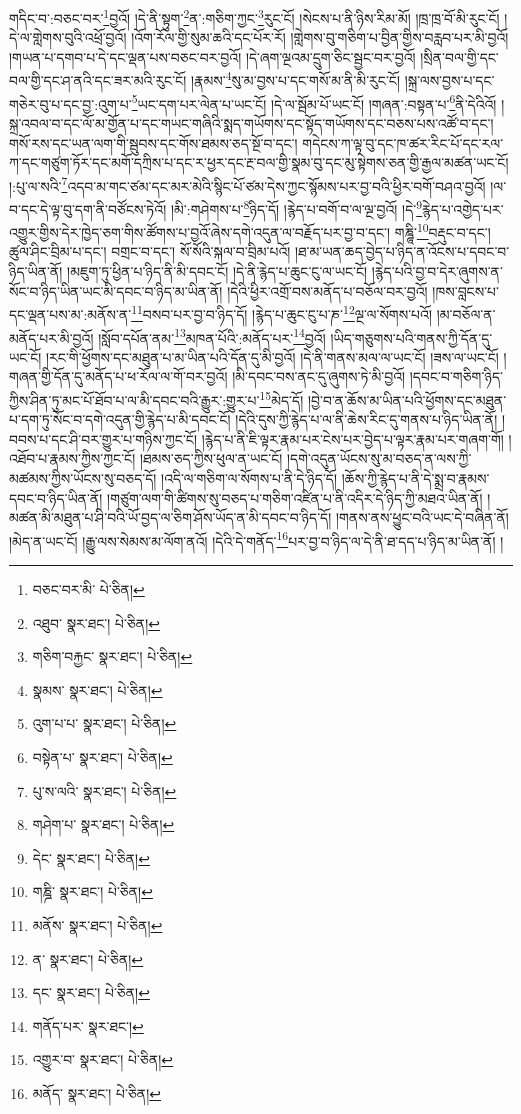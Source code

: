 གདིང་བ་:བཅང་བར་\footnote{བཅང་བར་མི་  པེ་ཅིན། }བྱའོ། །དེ་ནི་སྟུག་\footnote{འཐུབ་  སྣར་ཐང་།  པེ་ཅིན། }ན་:གཅིག་ཀྱང་\footnote{གཅིག་བརྐྱང་  སྣར་ཐང་།  པེ་ཅིན། }རུང་ངོ། །སེངས་པ་ནི་ཉིས་རིམ་མོ། །ཁྲ་ཁྲ་བོ་མི་རུང་ངོ། །དེ་ལ་གླེགས་བུའི་འཕྲོ་བྱའོ། །འོག་རོལ་གྱི་སུམ་ཆའི་དང་པོར་རོ། །གླེགས་བུ་གཅིག་པ་བྱིན་གྱིས་བརླབ་པར་མི་བྱའོ། །གཡན་པ་དགབ་པ་དེ་དང་ལྡན་པས་བཅང་བར་བྱའོ། །དེ་ཞག་ལྔའམ་དྲུག་ཅིང་སྦྱང་བར་བྱའོ། །སྲིན་བལ་གྱི་དང་བལ་གྱི་དང་ཤ་ནའི་དང་ཟར་མའི་རུང་ངོ། །རྣམས་\footnote{སྣམས་  སྣར་ཐང་།  པེ་ཅིན། }སུ་མ་བྱས་པ་དང་གསོ་མ་ནི་མི་རུང་ངོ། །སྐྲ་ལས་བྱས་པ་དང་གཅེར་བུ་པ་དང་བྱ་:འུག་པ་\footnote{འུག་པ་པ་  སྣར་ཐང་།  པེ་ཅིན། }ཡང་དག་པར་ལེན་པ་ཡང་ངོ། །དེ་ལ་སྦོམ་པོ་ཡང་ངོ། །གཞན་:བསྟན་པ་\footnote{བསྟེན་པ་  སྣར་ཐང་།  པེ་ཅིན། }ནི་དེའིའོ། །སྐྲ་འབལ་བ་དང་ལོ་མ་གྱོན་པ་དང་གཡང་གཞིའི་སྨད་གཡོགས་དང་སྟོད་གཡོགས་དང་བཅས་པས་འཚོ་བ་དང་། གསོ་རས་དང་ཡན་ལག་གི་སྦུབས་དང་གོས་ཐམས་ཅད་སྔོ་བ་དང་། གདེངས་ཀ་ལྟ་བུ་དང་ཁ་ཚར་རིང་པོ་དང་རལ་ཀ་དང་གཙུག་ཏོར་དང་མགོ་དཀྲིས་པ་དང་ར་ཕྱར་དང་རྔ་བལ་གྱི་སྣམ་བུ་དང་མུ་སྟེགས་ཅན་གྱི་རྒྱལ་མཚན་ཡང་ངོ། །:པུ་ལ་སའི་\footnote{པུ་ས་ལའི་  སྣར་ཐང་།  པེ་ཅིན། }འདབ་མ་གང་ཙམ་དང་མར་མེའི་སྙིང་པོ་ཙམ་དེས་ཀྱང་སྙོམས་པར་བྱ་བའི་ཕྱིར་བགོ་བཤའ་བྱའོ། །ལ་བ་དང་དེ་ལྟ་བུ་དག་ནི་བཙོངས་ཏེའོ། །མི་:གཤེགས་པ་\footnote{གཤེག་པ་  སྣར་ཐང་།  པེ་ཅིན། }ཉིད་དོ། །རྙེད་པ་བགོ་བ་ལ་ལྔ་བྱའོ། །དེ་\footnote{དེང་  སྣར་ཐང་།  པེ་ཅིན། }རྙེད་པ་འགྱེད་པར་འགྱུར་གྱིས་དེར་ཁྱེད་ཅག་གིས་ཚོགས་པ་བྱའོ་ཞེས་དགེ་འདུན་ལ་བརྗོད་པར་བྱ་བ་དང་། གཎྜཱི་\footnote{གཎྜི་  སྣར་ཐང་།  པེ་ཅིན། }བརྡུང་བ་དང་། ཚུལ་ཤིང་བྲིམ་པ་དང་། བགྲང་བ་དང་། སོ་སོའི་སྐལ་བ་བྲིམ་པའོ། །ཐ་མ་ཡན་ཆད་བྱེད་པ་ཉིད་ན་འོངས་པ་དབང་བ་ཉིད་ཡིན་ནོ། །མཇུག་ཏུ་ཕྱིན་པ་ཉིད་ནི་མི་དབང་ངོ། །དེ་ནི་རྙེད་པ་ཆུང་ངུ་ལ་ཡང་ངོ། །རྙེད་པའི་བྱ་བ་དེར་ཞུགས་ན་སོང་བ་ཉིད་ཡིན་ཡང་མི་དབང་བ་ཉིད་མ་ཡིན་ནོ། །དེའི་ཕྱིར་འགྲོ་བས་མནོད་པ་བཅོལ་བར་བྱའོ། །ཁས་བླངས་པ་དང་ལྡན་པས་མ་:མནོས་ན་\footnote{མནོས་  སྣར་ཐང་།  པེ་ཅིན། }བསབ་པར་བྱ་བ་ཉིད་དོ། །རྙེད་པ་ཆུང་ངུ་པ་ཎ་\footnote{ན་  སྣར་ཐང་།  པེ་ཅིན། }ལྔ་ལ་སོགས་པའོ། །མ་བཅོལ་ན་མནོད་པར་མི་བྱའོ། །སློབ་དཔོན་ནམ་\footnote{དང་  སྣར་ཐང་།  པེ་ཅིན། }མཁན་པོའི་:མནོད་པར་\footnote{གནོད་པར་  སྣར་ཐང་། }བྱའོ། །ཡིད་གཅུགས་པའི་གནས་ཀྱི་དོན་དུ་ཡང་ངོ། །རང་གི་ཕྱོགས་དང་མཐུན་པ་མ་ཡིན་པའི་དོན་དུ་མི་བྱའོ། །དེ་ནི་གནས་མལ་ལ་ཡང་ངོ། །ཟས་ལ་ཡང་ངོ། །གཞན་གྱི་དོན་དུ་མནོད་པ་ཕ་རོལ་ལ་གོ་བར་བྱའོ། །མི་དབང་བས་ནང་དུ་ཞུགས་ཏེ་མི་བྱའོ། །དབང་བ་གཅིག་ཉིད་ཀྱིས་ཤིན་ཏུ་མང་པོ་ཐོབ་པ་ལ་མི་དབང་བའི་རྒྱུར་:གྱུར་པ་\footnote{འགྱུར་བ་  སྣར་ཐང་།  པེ་ཅིན། }མེད་དོ། །བྱེ་བ་ན་ཆོས་མ་ཡིན་པའི་ཕྱོགས་དང་མཐུན་པ་དག་ཏུ་སོང་བ་དགེ་འདུན་གྱི་རྙེད་པ་མི་དབང་ངོ། །དེའི་དུས་ཀྱི་རྙེད་པ་ལ་ནི་ཆེས་རིང་དུ་གནས་པ་ཉིད་ཡིན་ནོ། །བབས་པ་དང་ཤི་བར་གྱུར་པ་གཉིས་ཀྱང་ངོ། །རྙེད་པ་ནི་ཇི་ལྟར་རྣམ་པར་ངེས་པར་བྱེད་པ་ལྟར་རྣམ་པར་གཞག་གོ། །འཐོབ་པ་རྣམས་ཀྱིས་ཀྱང་ངོ། །ཐམས་ཅད་ཀྱིས་ཕུལ་ན་ཡང་ངོ། །དགེ་འདུན་ཡོངས་སུ་མ་བཅད་ན་ལས་ཀྱི་མཚམས་ཀྱིས་ཡོངས་སུ་བཅད་དོ། །འདི་ལ་གཅིག་ལ་སོགས་པ་ནི་དེ་ཉིད་དོ། །ཆོས་ཀྱི་རྙེད་པ་ནི་དེ་སྨྲ་བ་རྣམས་དབང་བ་ཉིད་ཡིན་ནོ། །གཙུག་ལག་གི་ཚིགས་སུ་བཅད་པ་གཅིག་འཛིན་པ་ནི་འདིར་དེ་ཉིད་ཀྱི་མཐའ་ཡིན་ནོ། །མཚན་མི་མཐུན་པ་ཤི་བའི་ཡོ་བྱད་ལ་ཅིག་ཤོས་ཡོད་ན་མི་དབང་བ་ཉིད་དོ། །གནས་ནས་ཕྱུང་བའི་ཡང་དེ་བཞིན་ནོ། །མེད་ན་ཡང་ངོ། །རྒྱུ་ལས་སེམས་མ་ལོག་ནའོ། །དེའི་དེ་གནོད་\footnote{མནོད་  སྣར་ཐང་།  པེ་ཅིན། }པར་བྱ་བ་ཉིད་ལ་དེ་ནི་ཐ་དད་པ་ཉིད་མ་ཡིན་ནོ། །
